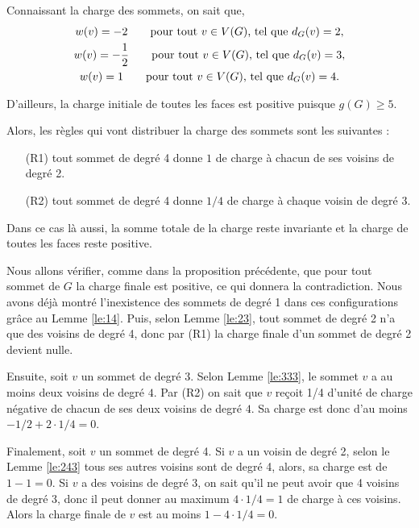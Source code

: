 \documentclass[10pt,a4paper]{article}
\begin{document}
Connaissant la charge des sommets, on sait que,
$$
\gathered
w(v) = -2 \qquad \textrm{pour tout $v \in V(G)$, tel que } d_G(v) = 2,\\
w(v) = -\frac{1}{2} \qquad \textrm{pour tout $v \in V(G)$, tel que } d_G(v) = 3,\\
w(v) =  1 \qquad \textrm{pour tout $v \in V(G)$, tel que } d_G(v) = 4.
\endgathered
$$

D'ailleurs, la charge initiale de toutes les faces est positive puisque $g(G) \geq 5$.


Alors, les règles qui vont distribuer la charge des sommets sont les suivantes :

\begin{enumerate}
\item[(R1)] tout sommet de degré 4 donne $1$ de charge à chacun de ses voisins de degré 2.
\item[(R2)] tout sommet de degré 4 donne $1/4$ de charge à chaque voisin de degré 3.
\end{enumerate}
Dans ce cas là aussi, la somme totale de la charge reste invariante et la charge de toutes les faces reste positive.

Nous allons vérifier, comme dans la proposition précédente, que pour tout sommet de $G$ la charge finale est positive, ce qui donnera la contradiction. Nous avons déjà montré l'inexistence des sommets de degré 1 dans ces configurations grâce au Lemme \ref{le:14}. Puis, selon Lemme \ref{le:23}, tout sommet de degré 2 n'a que des voisins de degré 4, donc par (R1) la charge finale d'un sommet de degré 2 devient nulle.

Ensuite, soit $v$ un sommet de degré $3$. Selon Lemme \ref{le:333}, le sommet $v$ a au moins deux voisins de degré $4$. Par (R2) on sait que $v$ reçoit 1/4 d'unité de charge négative de chacun de ses deux voisins de degré $4$. Sa charge est donc d'au moins $-1/2+2\cdot 1/4 = 0$.


Finalement, soit $v$ un sommet de degré 4. Si $v$ a un voisin de degré 2, selon le Lemme \ref{le:243} tous ses autres voisins sont de degré 4, alors, sa charge est de $1-1=0$. Si $v$ a des voisins de degré 3, on sait qu'il ne peut avoir que 4 voisins de degré 3, donc il peut donner au maximum $4 \cdot 1/4=1$ de charge à ces voisins. Alors la charge finale de $v$ est au moins $1 - 4\cdot 1/4 = 0$.
\end{document}
